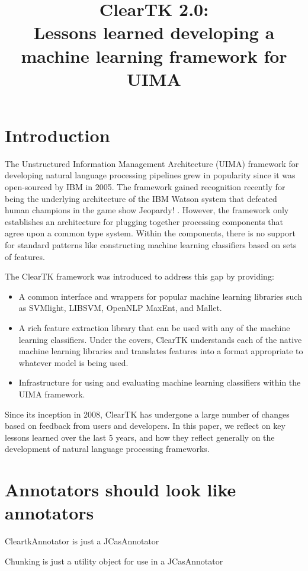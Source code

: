 \documentclass[10pt, a4paper]{article}
\title{ClearTK 2.0:\\ Lessons learned developing a machine learning framework for UIMA}
\begin{document}
\maketitleabstract

\section{Introduction}
The Unstructured Information Management Architecture (UIMA) framework for developing natural language processing pipelines grew in popularity since it was open-sourced by IBM in 2005.
The framework gained recognition recently for being the underlying architecture of the IBM Watson system that defeated human champions in the game show Jeopardy! \cite{ferrucci_building_2010}.
However, the framework only establishes an architecture for plugging together processing components that agree upon a common type system.
Within the components, there is no support for standard patterns like constructing machine learning classifiers based on sets of features.

The ClearTK framework was introduced to address this gap \cite{ogren-etal:2008:UIMA-LREC,ogren-etal:2009:UIMA-GSCL} by providing:
\begin{itemize}
\item A common interface and wrappers for popular machine learning libraries such as SVMlight, LIBSVM, OpenNLP MaxEnt, and Mallet.
\item A rich feature extraction library that can be used with any of the machine learning classifiers. Under the covers, ClearTK understands each of the native machine learning libraries and translates features into a format appropriate to whatever model is being used.
\item Infrastructure for using and evaluating machine learning classifiers within the UIMA framework.
\end{itemize}

Since its inception in 2008, ClearTK has undergone a large number of changes based on feedback from users and developers.
In this paper, we reflect on key lessons learned over the last 5 years, and how they reflect generally on the development of natural language processing frameworks.

\section{Annotators should look like annotators}

CleartkAnnotator is just a JCasAnnotator

Chunking is just a utility object for use in a JCasAnnotator
\end{document}
